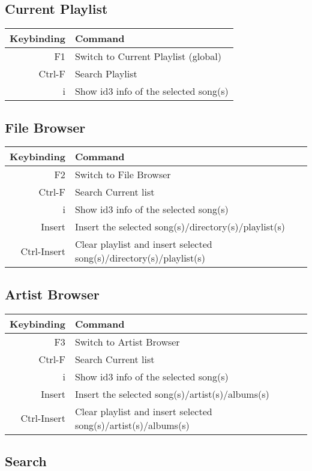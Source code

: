 \documentclass{article}
\begin{document}
\subsection{Current Playlist}

\begin{tabular}{r|l}
Keybinding&Command\\
\hline 
F1&Switch to Current Playlist (global)\\
Ctrl-F&Search Playlist\\
i&Show id3 info of the selected song(s)\\
\end{tabular}

\subsection{File Browser}

\begin{tabular}{r|l}
Keybinding&Command\\
\hline 
F2&Switch to File Browser\\
Ctrl-F&Search Current list\\
i&Show id3 info of the selected song(s)\\
Insert&Insert the selected song(s)/directory(s)/playlist(s)\\
Ctrl-Insert&Clear playlist and insert selected song(s)/directory(s)/playlist(s)\\
\end{tabular}

\subsection{Artist Browser}

\begin{tabular}{r|l}
Keybinding&Command\\
\hline 
F3&Switch to Artist Browser\\
Ctrl-F&Search Current list\\
i&Show id3 info of the selected song(s)\\
Insert&Insert the selected song(s)/artist(s)/albums(s)\\
Ctrl-Insert&Clear playlist and insert selected song(s)/artist(s)/albums(s)\\
\end{tabular}

\subsection{Search}
\end{document}
